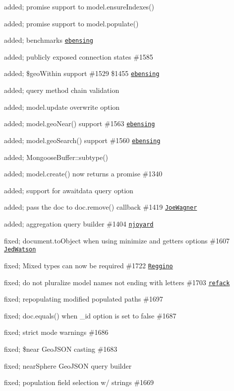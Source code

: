 \begin{DoxyItemize}
\item added; promise support to model.\+ensure\+Indexes()
\item added; promise support to model.\+populate()
\item added; benchmarks \href{https://github.com/ebensing}{\tt ebensing}
\item added; publicly exposed connection states \#1585
\item added; \$geo\+Within support \#1529 \$1455 \href{https://github.com/ebensing}{\tt ebensing}
\item added; query method chain validation
\item added; model.\+update {\ttfamily overwrite} option
\item added; model.\+geo\+Near() support \#1563 \href{https://github.com/ebensing}{\tt ebensing}
\item added; model.\+geo\+Search() support \#1560 \href{https://github.com/ebensing}{\tt ebensing}
\item added; Mongoose\+Buffer\+::subtype()
\item added; model.\+create() now returns a promise \#1340
\item added; support for {\ttfamily awaitdata} query option
\item added; pass the doc to doc.\+remove() callback \#1419 \href{https://github.com/JoeWagner}{\tt Joe\+Wagner}
\item added; aggregation query builder \#1404 \href{https://github.com/njoyard}{\tt njoyard}
\item fixed; document.\+to\+Object when using {\ttfamily minimize} and {\ttfamily getters} options \#1607 \href{https://github.com/JedWatson}{\tt Jed\+Watson}
\item fixed; Mixed types can now be required \#1722 \href{https://github.com/Reggino}{\tt Reggino}
\item fixed; do not pluralize model names not ending with letters \#1703 \href{https://github.com/refack}{\tt refack}
\item fixed; repopulating modified populated paths \#1697
\item fixed; doc.\+equals() when \+\_\+id option is set to false \#1687
\item fixed; strict mode warnings \#1686
\item fixed; \$near Geo\+J\+S\+ON casting \#1683
\item fixed; near\+Sphere Geo\+J\+S\+ON query builder
\item fixed; population field selection w/ strings \#1669

\end{DoxyItemize}
